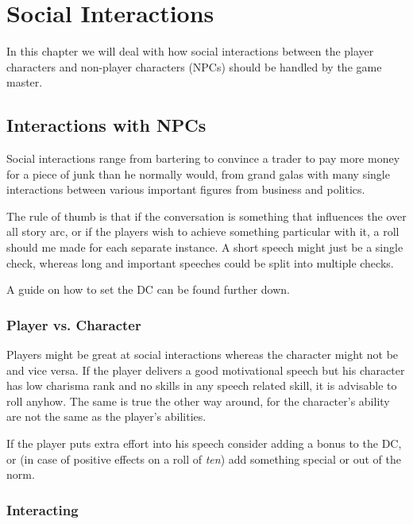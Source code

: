 \chapter{Social Interactions}
\label{chap:Social Interactions}

In this chapter we will deal with how social interactions between the player
characters and non-player characters (NPCs) should be handled by the game
master.

\section{Interactions with NPCs}
\label{sec:7-Interactions with NPCs}

Social interactions range from bartering to convince a trader to pay more
money for a piece of junk than he normally would, from grand galas with many
single interactions between various important figures from business and
politics.

The rule of thumb is that if the conversation is something that influences the
over all story arc, or if the players wish to achieve something particular
with it, a roll should me made for each separate instance. A short speech
might just be a single check, whereas long and important speeches could be
split into multiple checks.

A guide on how to set the DC can be found further down.

\subsection{Player vs. Character}
\label{sub:7-Player vs. Character}

Players might be great at social interactions whereas the character might not
be and vice versa. If the player delivers a good motivational speech but his
character has low charisma rank and no skills in any speech related skill, it
is advisable to roll anyhow. The same is true the other way around, for the
character's ability are not the same as the player's abilities.

If the player puts extra effort into his speech consider adding a bonus to
the DC, or (in case of positive effects on a roll of \emph{ten}) add something
special or out of the norm.

\subsection{Interacting}
\label{sub:7-Interacting}

